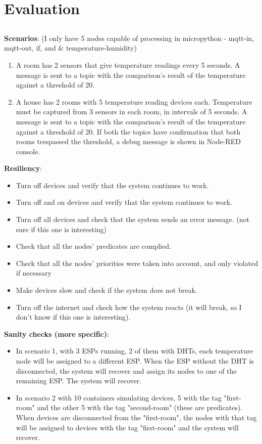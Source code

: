 \chapter{Evaluation} \label{chap:evaluation}

\section*{}

\textbf{Scenarios}:
(I only have 5 nodes capable of processing in micropython - mqtt-in, mqtt-out, if, and \& temperature-humidity)
\begin{enumerate}
    \item A room has 2 sensors that give temperature readings every 5  seconds. A message is sent to a topic with the comparison's result of the temperature against a threshold of 20.
    \item A house has 2 rooms with 5 temperature reading devices each. Temperature must be captured from 3 sensors in each room, in intervals of 5 seconds. A message is sent to a topic with the comparison's result of the temperature against a threshold of 20. If both the topics have confirmation that both rooms trespassed the threshold, a debug message is shown in Node-RED console.
\end{enumerate}

\textbf{Resiliency}:
\begin{itemize}
    \item Turn off devices and verify that the system continues to work.
    \item Turn off and on devices and verify that the system continues to work.
    \item Turn off all devices and check that the system sends an error message. (not sure if this one is interesting)
    \item Check that all the nodes' predicates are complied.
    \item Check that all the nodes' priorities were taken into account, and only violated if necessary
    \item Make devices slow and check if the system does not break.
    \item Turn off the internet and check how the system reacts (it will break, so I don't know if this one is interesting).
\end{itemize}

\textbf{Sanity checks (more specific)}:
\begin{itemize}
    \item In scenario 1, with 3 ESPs running, 2 of them with DHTs, each temperature node will be assigned to a different ESP. When the ESP without the DHT is disconnected, the system will recover and assign its nodes to one of the remaining ESP. The system will recover.
    \item In scenario 2 with 10 containers simulating devices, 5 with the tag "first-room" and the other 5 with the tag "second-room" (these are predicates). When devices are disconnected from the "first-room", the nodes with that tag will be assigned to devices with the tag "first-room" and the system will recover.
\end{itemize}

